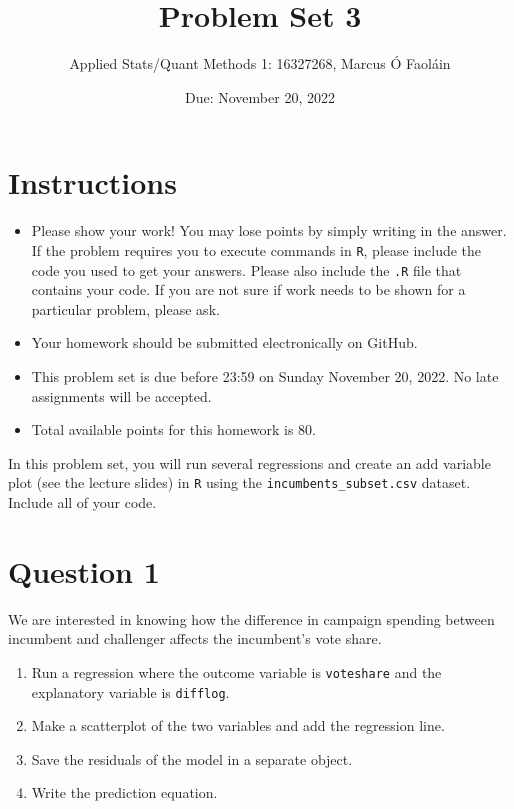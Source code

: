 \documentclass[12pt,letterpaper]{article}
\title{Problem Set 3}
\date{Due: November 20, 2022}
\author{Applied Stats/Quant Methods 1: 16327268, Marcus Ó Faoláin}
\begin{document}
	\maketitle
	\section*{Instructions}
	\begin{itemize}
		\item Please show your work! You may lose points by simply writing in the answer. If the problem requires you to execute commands in \texttt{R}, please include the code you used to get your answers. Please also include the \texttt{.R} file that contains your code. If you are not sure if work needs to be shown for a particular problem, please ask.
	\item Your homework should be submitted electronically on GitHub.
	\item This problem set is due before 23:59 on Sunday November 20, 2022. No late assignments will be accepted.
	\item Total available points for this homework is 80.
	\end{itemize}

		\vspace{.25cm}
	
\noindent In this problem set, you will run several regressions and create an add variable plot (see the lecture slides) in \texttt{R} using the \texttt{incumbents\_subset.csv} dataset. Include all of your code.

	\vspace{.5cm}
\section*{Question 1}
\vspace{.25cm}
\noindent We are interested in knowing how the difference in campaign spending between incumbent and challenger affects the incumbent's vote share. 
	\begin{enumerate}
		\item Run a regression where the outcome variable is \texttt{voteshare} and the explanatory variable is \texttt{difflog}.	\vspace{5cm}
		\item Make a scatterplot of the two variables and add the regression line. 	\vspace{7cm}
		\item Save the residuals of the model in a separate object.	\vspace{7cm}
		\item Write the prediction equation.
	\end{enumerate}
	
\end{document}
